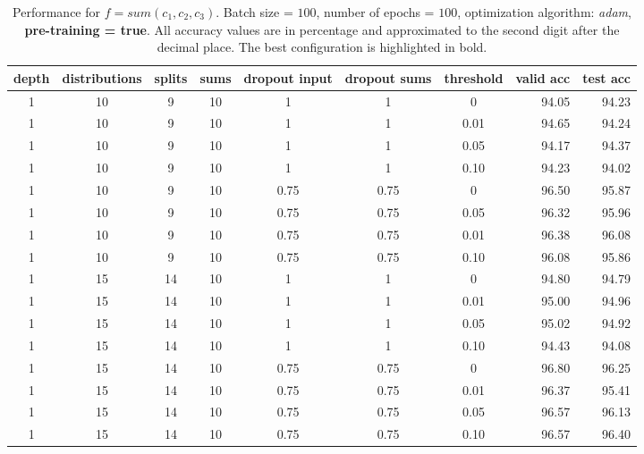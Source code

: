 \begin{table}[H]
  \centering
  \caption{Performance for $\mathit{f} = sum(\mathit{c}_1,\mathit{c}_2,\mathit{c}_3)$. Batch size = $100$, number of epochs = $100$, optimization algorithm: \textit{adam}, \textbf{pre-training = true}. All accuracy values are in percentage and approximated to the second digit after the decimal place. The best configuration is highlighted in bold.}
  \label{tab:results-triples-clyes}
  \scriptsize
  \begin{tabular}{cccccccrr}
    \toprule
    depth		& distributions 	& splits 		& sums 				& dropout input 		& dropout sums 			& threshold				& valid acc 			& test acc\\
    \midrule
	1      		& 10     			& 9      		& 10     			& 1      				& 1      				& 0      				& 94.05    				& 94.23\\ 
	1      		& 10     			& 9				& 10     			& 1      				& 1      				& 0.01    				& 94.65    			    & 94.24\\ 
	1      		& 10     			& 9      		& 10     			& 1      				& 1      				& 0.05    				& 94.17    				& 94.37\\
	1      		& 10     			& 9      		& 10     			& 1      				& 1      				& 0.10    				& 94.23    				& 94.02\\
    1      		& 10     			& 9      		& 10     			& 0.75    				& 0.75    				& 0      				& 96.50    				& 95.87\\
	1      		& 10     			& 9      		& 10     			& 0.75    				& 0.75    				& 0.05    				& 96.32    				& 95.96\\
	1      		& 10     			& 9      		& 10     			& 0.75    				& 0.75    				& 0.01    				& 96.38    				& 96.08\\ 
	1      		& 10     			& 9      		& 10     			& 0.75    				& 0.75    				& 0.10    				& 96.08    				& 95.86\\ 

	1      		& 15     			& 14     		& 10     			& 1      				& 1      				& 0      				& 94.80   				& 94.79\\
	1      		& 15     			& 14     		& 10     			& 1      				& 1      				& 0.01    				& 95.00    				& 94.96\\ 		
	1      		& 15     			& 14     		& 10     			& 1      				& 1      				& 0.05    				& 95.02    				& 94.92\\
	1      		& 15     			& 14     		& 10     			& 1      				& 1      				& 0.10    				& 94.43					& 94.08\\
	1      		& 15     			& 14     		& 10     			& 0.75    				& 0.75    				& 0      				& 96.80					& 96.25\\ 
	1      		& 15     			& 14     		& 10     			& 0.75					& 0.75					& 0.01					& 96.37    				& 95.41\\ 
	1      		& 15     			& 14     		& 10     			& 0.75    				& 0.75    				& 0.05    				& 96.57    				& 96.13\\ 
	1      		& 15     			& 14     		& 10     			& 0.75    				& 0.75    				& 0.10    				& 96.57    				& 96.40\\ 


\end{tabular}
\end{table}
